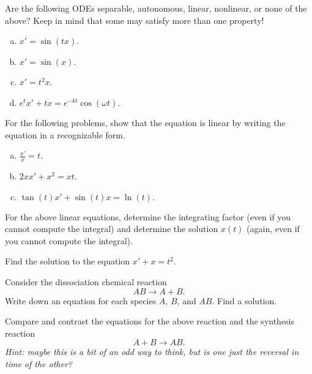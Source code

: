 \begin{problem}
Are the following ODEs separable, autonomous, linear, nonlinear, or none of the above? Keep in mind that some may satisfy more than one property!
    \begin{enumerate}[(a)]
        \item $x' = \sin(tx)$.
        \item $x' = \sin(x)$.
        \item $x' = t^2 x$.
        \item $e^t x' + tx = e^{-k t} \cos(\omega t).$
    \end{enumerate}
\end{problem}

\begin{problem}
For the following problems, show that the equation is linear by writing the equation in a recognizable form.
    \begin{enumerate}[(a)]
        \item $\frac{x'}{x} = t$.
        \item $2xx'+x^2=xt$.
        \item $\tan(t) x' + \sin(t) x = \ln(t).$
    \end{enumerate}
\end{problem}

\begin{problem}
    For the above linear equations, determine the integrating factor (even if you cannot compute the integral) and determine the solution $x(t)$ (again, even if you cannot compute the integral).
\end{problem}

\begin{problem}
    Find the solution to the equation $x'+x=t^2$.
\end{problem}

\begin{problem}
    Consider the dissociation chemical reaction
    \[
        AB \to A + B.
    \]
    Write down an equation for each species $A$, $B$, and $AB$.  Find a solution.
\end{problem}

\begin{problem}
    Compare and contrast the equations for the above reaction and the synthesis reaction
    \[
        A+B \to AB.
    \]
    \emph{Hint: maybe this is a bit of an odd way to think, but is one just the reversal in time of the other?}
\end{problem}


